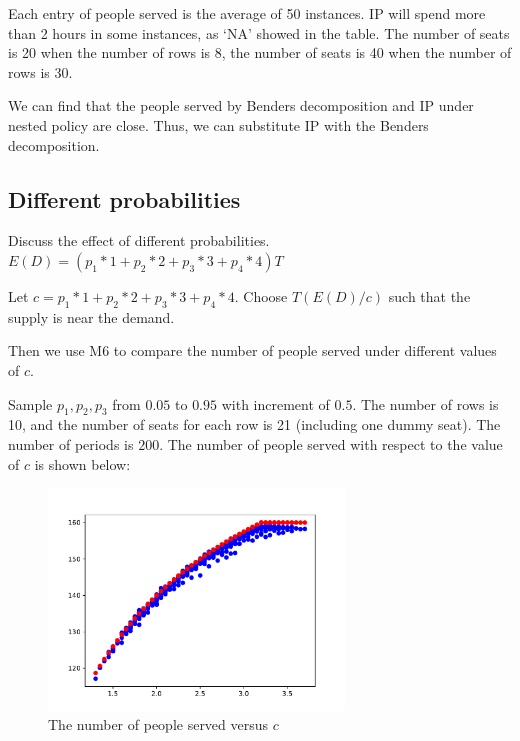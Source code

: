 Each entry of people served is the average of 50 instances.
IP will spend more than 2 hours in some instances, as `NA' showed in the table.
The number of seats is 20 when the number of rows is 8, the number of seats is 40 when the number of rows is 30.

We can find that the people served by Benders decomposition and IP under nested policy are close. Thus, we can substitute IP with the Benders decomposition.


\subsection{Different probabilities}
Discuss the effect of different probabilities.
$E(D) = (p_1 * 1 + p_2 * 2 + p_3 * 3 + p_4 * 4) T$

Let $c = p_1 * 1 + p_2 * 2 + p_3 * 3 + p_4 * 4$. Choose $T(E(D)/c)$ such that the supply is near the demand. 


Then we use M6 to compare the number of people served under different values of $c$.

Sample $p_1, p_2, p_3$ from $0.05$ to $0.95$ with increment of $0.5$. The number of rows is 10, and the number of seats for each row is 21 (including one dummy seat). The number of periods is $200$. The number of people served with respect to the value of $c$ is shown below:


\begin{figure}[ht]
  \centering
  \includegraphics[width = 0.7\textwidth]{./Figures/diff_2.pdf}
  \caption{The number of people served versus $c$}
\end{figure}

